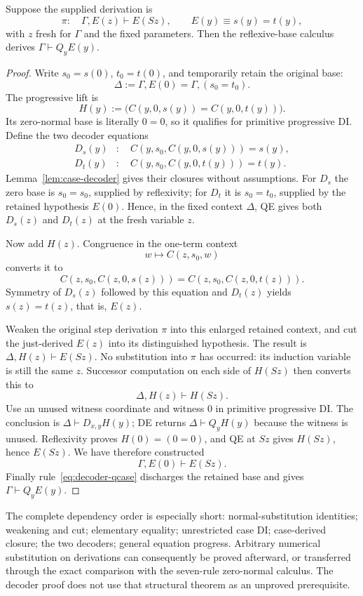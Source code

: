 \begin{theorem}
\label{thm:decoder-progress}
Suppose the supplied derivation is
\[
 \pi:\quad\Gamma,E(z)\vdash E(Sz),\qquad
 E(y)\equiv s(y)=t(y),
\]
with $z$ fresh for $\Gamma$ and the fixed parameters.  Then the
reflexive-base calculus derives $\Gamma\vdash Q_yE(y)$.
\end{theorem}
\begin{proof}
Write $s_0=s(0)$, $t_0=t(0)$, and temporarily retain the original base:
\[
 \Delta:=\Gamma,E(0)=\Gamma,(s_0=t_0).
\]
The progressive lift is
\[
 H(y):=\bigl(C(y,0,s(y))=C(y,0,t(y))\bigr).
\]
Its zero-normal base is literally $0=0$, so it qualifies for primitive
progressive DI.  Define the two decoder equations
\begin{align*}
 D_s(y)&:\quad C(y,s_0,C(y,0,s(y)))=s(y),\\
 D_t(y)&:\quad C(y,s_0,C(y,0,t(y)))=t(y).
\end{align*}
Lemma~\ref{lem:case-decoder} gives their closures without assumptions.
For $D_s$ the zero base is $s_0=s_0$, supplied by reflexivity; for
$D_t$ it is $s_0=t_0$, supplied by the retained hypothesis $E(0)$.
Hence, in the fixed context $\Delta$, QE gives both $D_s(z)$ and
$D_t(z)$ at the fresh variable $z$.

Now add $H(z)$.  Congruence in the one-term context
\[
 w\longmapsto C(z,s_0,w)
\]
converts it to
\[
 C(z,s_0,C(z,0,s(z)))
   =C(z,s_0,C(z,0,t(z))).
\]
Symmetry of $D_s(z)$ followed by this equation and $D_t(z)$ yields
$s(z)=t(z)$, that is, $E(z)$.

Weaken the original step derivation $\pi$ into this enlarged retained
context, and cut the just-derived $E(z)$ into its distinguished
hypothesis.  The result is $\Delta,H(z)\vdash E(Sz)$.
No substitution into $\pi$ has occurred: its induction variable is
still the same $z$.  Successor computation on each side of $H(Sz)$
then converts this to
\[
 \Delta,H(z)\vdash H(Sz).
\]
Use an unused witness coordinate and witness $0$ in primitive
progressive DI.  The conclusion is $\Delta\vdash D_{x,y}H(y)$;
DE returns $\Delta\vdash Q_yH(y)$ because the witness is unused.
Reflexivity proves $H(0)=(0=0)$, and QE at $Sz$ gives $H(Sz)$, hence
$E(Sz)$.  We have therefore constructed
\[
 \Gamma,E(0)\vdash E(Sz).
\]
Finally rule~\eqref{eq:decoder-qcase} discharges the retained base and
gives $\Gamma\vdash Q_yE(y)$.
\end{proof}

The complete dependency order is especially short: normal-substitution
identities; weakening and cut; elementary equality; unrestricted case
DI; case-derived closure; the two decoders; general equation progress.
Arbitrary numerical substitution on derivations can consequently be
proved afterward, or transferred through the exact comparison with the
seven-rule zero-normal calculus.  The decoder proof does not use that
structural theorem as an unproved prerequisite.

